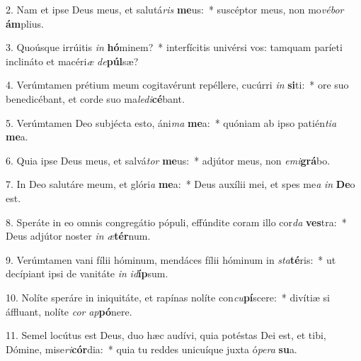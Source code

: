 2. Nam et ipse Deus meus, et salutá\textit{ris} \textbf{me}us:~*  suscéptor meus, non mo\textit{vé}\textit{bor} \textbf{ám}plius.\

3. Quoúsque irrúitis \textit{in} \textbf{hó}minem?~*  interfícitis univérsi vos: tamquam paríeti inclináto et macéri\textit{æ} \textit{de}\textbf{púl}sæ?\

4. Verúmtamen prétium meum cogitavérunt repéllere, cucúrri \textit{in} \textbf{si}ti:~*  ore suo benedicébant, et corde suo ma\textit{le}\textit{di}\textbf{cé}bant.\

5. Verúmtamen Deo subjécta esto, áni\textit{ma} \textbf{me}a:~*  quóniam ab ipso patién\textit{ti}\textit{a} \textbf{me}a.\

6. Quia ipse Deus meus, et salvá\textit{tor} \textbf{me}us:~*  adjútor meus, non \textit{e}\textit{mi}\textbf{grá}bo.\

7. In Deo salutáre meum, et glóri\textit{a} \textbf{me}a:~*  Deus auxílii mei, et spes me\textit{a} \textit{in} \textbf{De}o est.\

8. Speráte in eo omnis congregátio pópuli, effúndite coram illo cor\textit{da} \textbf{ves}tra:~*  Deus adjútor noster \textit{in} \textit{æ}\textbf{tér}num.\

9. Verúmtamen vani fílii hóminum, mendáces fílii hóminum in \textit{sta}\textbf{té}ris:~*  ut decípiant ipsi de vanitáte \textit{in} \textit{id}\textbf{íp}sum.\

10. Nolíte speráre in iniquitáte, et rapínas nolíte con\textit{cu}\textbf{pí}scere:~*  divítiæ si áffluant, nolíte \textit{cor} \textit{ap}\textbf{pó}nere.\

11. Semel locútus est Deus, duo hæc audívi, quia potéstas Dei est, et tibi, Dómine, mise\textit{ri}\textbf{cór}dia:~*  quia tu reddes unicuíque juxta ó\textit{pe}\textit{ra} \textbf{su}a.\

